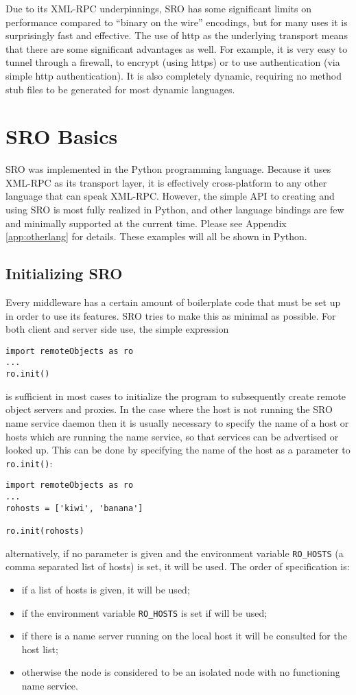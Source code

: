 \documentclass[11pt]{report}
\begin{document}
Due to its XML-RPC underpinnings, SRO has some significant limits on
performance compared to ``binary on the wire'' encodings, but for many
uses it is surprisingly fast and effective.  The use of http as the
underlying transport means that there are some significant advantages as
well.  For example, it is very easy to tunnel through a firewall, to
encrypt (using https) or to use authentication (via simple http
authentication).  It is also completely dynamic, requiring no method
stub files to be generated for most dynamic languages.  

\chapter{SRO Basics}
SRO was implemented in the Python programming language.  Because it uses
XML-RPC as its transport layer, it is effectively cross-platform to any
other language that can speak XML-RPC.  However, the simple API to
creating and using SRO is most fully realized in Python, and other
language bindings are few and minimally supported at the current time.
Please see Appendix \ref{app:otherlang} for details.  These examples
will all be shown in Python.

\section{Initializing SRO}
Every middleware has a certain amount of boilerplate code that must be
set up in order to use its features.  SRO tries to make this as minimal
as possible.  For both client and server side use, the simple expression
\begin{verbatim}
import remoteObjects as ro
...
ro.init()
\end{verbatim}
is sufficient in most cases to initialize the program to subsequently
create remote object servers and proxies.  
In the case where the host is not running the SRO name service daemon
then it is usually necessary to specify the name of a host or hosts
which are running the name service, so that services can be advertised
or looked up.  This can be done by specifying the name of the host as a
parameter to {\tt ro.init()}:
\begin{verbatim}
import remoteObjects as ro
...
rohosts = ['kiwi', 'banana']

ro.init(rohosts)
\end{verbatim}
alternatively, if no parameter is given and the environment variable
{\tt RO\_HOSTS} (a comma separated list of hosts) is set, it will be
used.
The order of specification is:
\begin{itemize}
\item if a list of hosts is given, it will be used;
\item if the environment variable {\tt RO\_HOSTS} is set if will be used;
\item if there is a name server running on the local host it will be
  consulted for the host list;
\item otherwise the node is considered to be an isolated node with no
  functioning name service.
\end{itemize}
\end{document}
